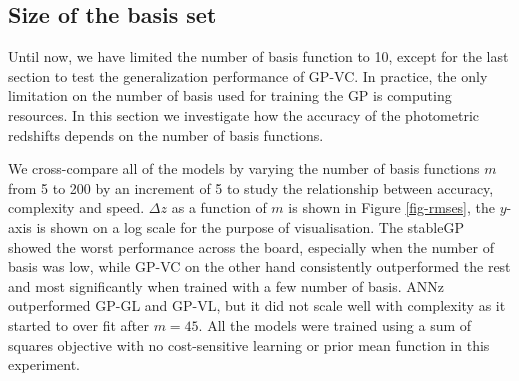\documentclass[useAMS,usenatbib,fleqn]{mn2e}
\begin{document}
\subsection{Size of the basis set}

Until now, we have limited the number of basis function to 10, except for the last section to test the generalization performance of GP-VC. In practice, the only limitation on the number of basis used for training the GP is computing resources. In this section we investigate how the accuracy of the photometric redshifts depends on the number of basis functions.

We cross-compare all of the models by varying the number of basis functions $m$ from 5 to 200 by an increment of 5 to study the relationship between accuracy, complexity and speed. $\Delta z$ as a function of $m$ is shown in Figure \ref{fig-rmses}, the $y$-axis is shown on a log scale for the purpose of visualisation. The stableGP showed the worst performance across the board, especially when the number of basis was low, while GP-VC on the other hand consistently outperformed the rest and most significantly when trained with a few number of basis. ANNz outperformed GP-GL and GP-VL, but it did not scale well with complexity as it started to over fit after $m=45$. All the models were trained using a sum of squares objective with no cost-sensitive learning or prior mean function in this experiment. 
\end{document}

